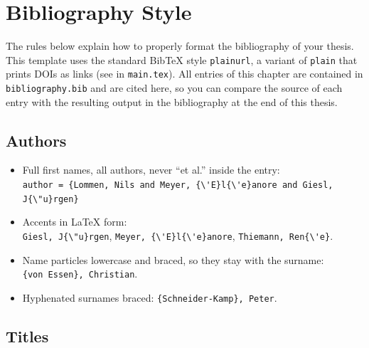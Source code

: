 \chapter{Bibliography Style}\label{app:bibliography-style}

The rules below explain how to properly format the bibliography of your thesis.
This template uses the standard Bib\TeX{} style \lstinline|plainurl|, a variant
of \lstinline|plain| that prints DOIs as links
(see \lstinline|| in \lstinline|main.tex|).
All entries of this chapter are contained in \lstinline|bibliography.bib|
and are cited here, so you can compare the source of each entry with the
resulting output in the bibliography at the end of this thesis.

\section{Authors}\label{sec:bib-authors}

\begin{itemize}
    \item Full first names, all authors, never ``et al.'' inside the entry:\\
          \lstinline|author = {Lommen, Nils and Meyer, {\'E}l{\'e}anore and Giesl, J{\"u}rgen}|
    \item Accents in \LaTeX{} form:\\
          \lstinline|Giesl, J{\"u}rgen|,
          \lstinline|Meyer, {\'E}l{\'e}anore|, \lstinline|Thiemann, Ren{\'e}|.
    \item Name particles lowercase and braced, so they stay with the surname:\\
          \lstinline|{von Essen}, Christian|.
    \item Hyphenated surnames braced: \lstinline|{Schneider-Kamp}, Peter|.
\end{itemize}

\section{Titles}\label{sec:bib-titles}

